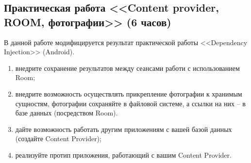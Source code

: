 \subsection{Практическая работа <<Content provider, ROOM, фотографии>> (6 часов)}

В данной работе модифицируется результат практической работы <<Dependency Injection>> (Android).

\begin{enumerate}
	\item внедрите сохранение результатов между сеансами работи с использованием Room;
	\item внедрите возможность осуществлять прикрепление фотографии к хранимым сущностям, фотографии сохраняйте в файловой системе, а ссылки на них -- в базе данных (посредством Room).
	\item дайте возможность работать другим приложениям с вашей базой данных (создайте Content Provider);
	\item реализуйте протип приложения, работающий с вашим Content Provider.
\end{enumerate}

